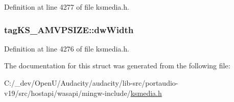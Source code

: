 Definition at line 4277 of file ksmedia.\+h.

\subsubsection[{\texorpdfstring{dw\+Width}{dwWidth}}]{ tag\+K\+S\+\_\+\+A\+M\+V\+P\+S\+I\+Z\+E\+::dw\+Width}\hypertarget{structtag_k_s___a_m_v_p_s_i_z_e_afdbfd651508c0a88fa0ac99ef64a2546}{}\label{structtag_k_s___a_m_v_p_s_i_z_e_afdbfd651508c0a88fa0ac99ef64a2546}


Definition at line 4276 of file ksmedia.\+h.



The documentation for this struct was generated from the following file\+:\begin{DoxyCompactItemize}
\item 
C\+:/\+\_\+dev/\+Open\+U/\+Audacity/audacity/lib-\/src/portaudio-\/v19/src/hostapi/wasapi/mingw-\/include/\hyperlink{ksmedia_8h}{ksmedia.\+h}\end{DoxyCompactItemize}
